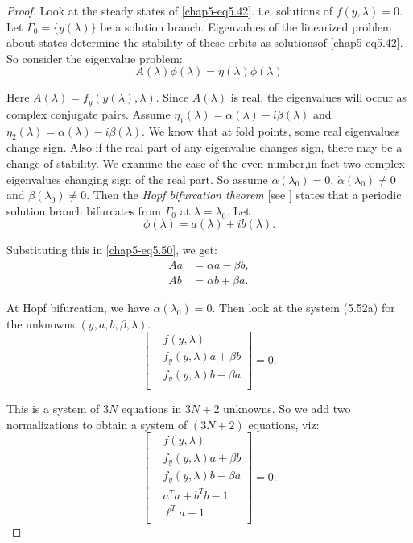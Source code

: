 \begin{proof}
Look at the steady states of \eqref{chap5-eq5.42}. i.e. solutions of $f(y,
\lambda) =0$. Let $\Gamma_0=\{y(\lambda)\}$ be a solution
branch. Eigenvalues of the linearized problem about states determine
the stability of these orbits as solutions\pageoriginale of
\eqref{chap5-eq5.42}. So consider the eigenvalue problem: 
$$
A(\lambda)\phi(\lambda) = \eta(\lambda) \phi(\lambda) 
$$

Here $A(\lambda) = f_y(y(\lambda),\lambda)$. Since $A(\lambda)$ is
real, the eigenvalues will occur as complex conjugate pairs. Assume
$\eta_1(\lambda) = \alpha(\lambda) + i\beta(\lambda)$ and $\eta_2(\lambda) =
\alpha(\lambda) - i\beta(\lambda)$. We know that at fold points, some
real eigenvalues change sign. Also if the real part of any eigenvalue
changes sign, there may be a change of stability. We examine the case
of the even number,in fact two complex eigenvalues changing sign of
the real part. So assume $\alpha(\lambda_0) = 0$, $\dot{\alpha}(\lambda_0)
\neq 0$ and $\beta(\lambda_0) \neq 0$. Then the \textit{Hopf
  bifurcation theorem} [see \cite{key25}] states that a periodic
solution branch bifurcates from $\Gamma_0$ at $\lambda =
\lambda_0$. Let  
$$
\phi(\lambda) = a(\lambda) + ib(\lambda).
$$

Substituting this in \eqref{chap5-eq5.50}, we get:
\begin{equation*}
\begin{split}
Aa & = \alpha a - \beta b,\\
Ab & = \alpha b + \beta a.
\end{split}\tag{5.51}\label{chap5-eq5.51}
\end{equation*}

At Hopf bifurcation, we have $\alpha(\lambda_0) = 0$. Then look at the
system (5.52a) for the unknowns $(y,a,b,\beta,\lambda)$. 
\begin{equation*}
\left[
\begin{aligned}
& f(y,\lambda )\\
 & f_y(y,\lambda )a + \beta b\\
& f_y(y,\lambda) b - \beta a\\
\end{aligned}
\right] = 0. \tag{5.52a}\label{chap5-eq5.52a}
\end{equation*}

This is a system of $3N$ equations in $3N + 2$ unknowns. So we add two
normalizations to obtain a system of $(3N+2)$ equations, viz: 
\begin{equation*}
\left[
\begin{aligned}
& f(y,\lambda)\\
& f_y(y,\lambda ) a + \beta b\\
& f_y(y,\lambda ) b - \beta a \\
& a^T a +  b^T b - 1\\
& \ell^T a - 1\\
\end{aligned}
\right] = 0.\tag{5.52b}\label{chap5-eq5.52b}
\end{equation*}\pageoriginale


\end{proof}
